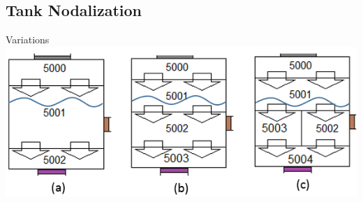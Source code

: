 \documentclass[10pt,t,xcolor=table]{UWMadBeamer}
\begin{document}
\subsection{Tank Nodalization}

\begin{frame}{Variations}
    \centering
    \vfill
    \includegraphics[width=0.75\paperwidth]{TankNodalization}
    \vfill
\end{frame}

\end{document}
